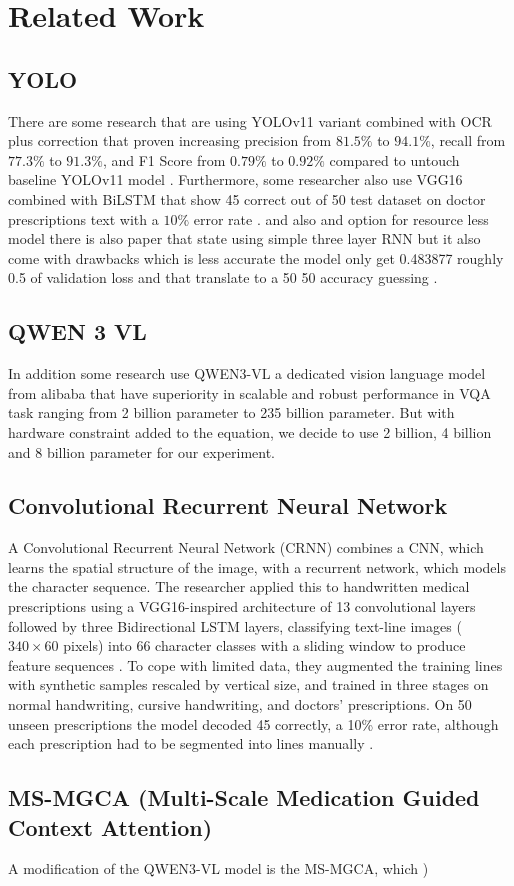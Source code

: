 \section{Related Work}\label{sec:related-work}
\subsection{YOLO}
There are some research that are using YOLOv11 variant combined with OCR plus correction that proven increasing precision from $81.5\%$ to $94.1\%$, recall from $77.3\%$ to $91.3\%$, and F1 Score from $0.79\%$ to $0.92\%$ compared to untouch baseline YOLOv11 model \cite{jeevidha2026advanced}. Furthermore, some researcher also use VGG16 combined with BiLSTM that show 45 correct out of 50 test dataset on doctor prescriptions text with a $10\%$ error rate \cite{achkar2019medical}. and also and option for resource less model there is also paper that state using simple three layer RNN but it also come with drawbacks which is less accurate the model only get 0.483877 roughly 0.5 of validation loss and that translate to a 50 50 accuracy guessing \cite{shaw2021medical}.  

\subsection{QWEN 3 VL}
In addition some research use QWEN3-VL a dedicated vision language model from alibaba that have superiority in scalable and robust performance in VQA task ranging from 2 billion parameter to 235 billion parameter. But with hardware constraint added to the equation, we decide to use 2 billion, 4 billion and 8 billion parameter for our experiment. \cite{lopez2026comparative}

\subsection{Convolutional Recurrent Neural Network}
A Convolutional Recurrent Neural Network (CRNN) combines a CNN, which learns the spatial structure of the image, with a recurrent network, which models the character sequence. The researcher applied this to handwritten medical prescriptions using a VGG16-inspired architecture of 13 convolutional layers followed by three Bidirectional LSTM layers, classifying text-line images ($340 \times 60$ pixels) into 66 character classes with a sliding window to produce feature sequences \cite{achkar2019medical}. To cope with limited data, they augmented the training lines with synthetic samples rescaled by vertical size, and trained in three stages on normal handwriting, cursive handwriting, and doctors' prescriptions. On 50 unseen prescriptions the model decoded 45 correctly, a 10\% error rate, although each prescription had to be segmented into lines manually \cite{achkar2019medical}.

\subsection{MS-MGCA (Multi-Scale Medication Guided Context Attention)}
A modification of the QWEN3-VL model is the MS-MGCA, which )
